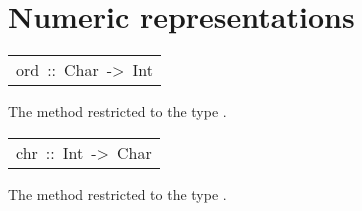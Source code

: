 \section{Numeric representations
}
\begin{haddockdesc}
\item[\begin{tabular}{@{}l}
ord\ ::\ Char\ ->\ Int
\end{tabular}]\haddockbegindoc
The  method restricted to the type .
\par

\end{haddockdesc}
\begin{haddockdesc}
\item[\begin{tabular}{@{}l}
chr\ ::\ Int\ ->\ Char
\end{tabular}]\haddockbegindoc
The  method restricted to the type .
\par

\end{haddockdesc}
